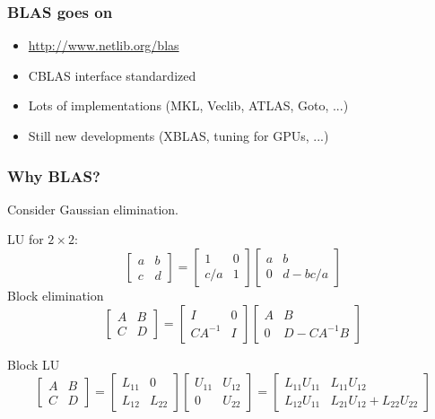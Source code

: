\documentclass{beamer}
\begin{document}
\begin{frame}
  \frametitle{BLAS goes on}
  
  \begin{itemize}
  \item \url{http://www.netlib.org/blas}
  \item CBLAS interface standardized
  \item Lots of implementations (MKL, Veclib, ATLAS, Goto, ...)
  \item Still new developments (XBLAS, tuning for GPUs, ...)
  \end{itemize}

\end{frame}


\begin{frame}
  \frametitle{Why BLAS?}

  Consider Gaussian elimination.

  \vspace{5mm}
  LU for $2 \times 2$:
  \[
  \begin{bmatrix}
    a & b \\
    c & d
  \end{bmatrix} =
  \begin{bmatrix}
    1 & 0 \\
    c/a & 1
  \end{bmatrix}
  \begin{bmatrix}
    a & b \\
    0 & d-bc/a
  \end{bmatrix}
  \]
  Block elimination
  \[
  \begin{bmatrix}
    A & B \\
    C & D
  \end{bmatrix} =
  \begin{bmatrix}
    I & 0 \\
    CA^{-1} & I
  \end{bmatrix}
  \begin{bmatrix}
    A & B \\
    0 & D-CA^{-1}B
  \end{bmatrix} 
  \]

  \vspace{5mm}
  Block LU
  \[
  \begin{bmatrix}
    A & B \\
    C & D
  \end{bmatrix} = 
  \begin{bmatrix}
    L_{11} & 0 \\
    L_{12} & L_{22} 
  \end{bmatrix}
  \begin{bmatrix}
    U_{11} & U_{12} \\
    0 & U_{22} 
  \end{bmatrix} =
  \begin{bmatrix}
    L_{11} U_{11} & L_{11} U_{12} \\
    L_{12} U_{11} & L_{21} U_{12} + L_{22} U_{22}
  \end{bmatrix}
  \]

\end{frame}
\end{document}
